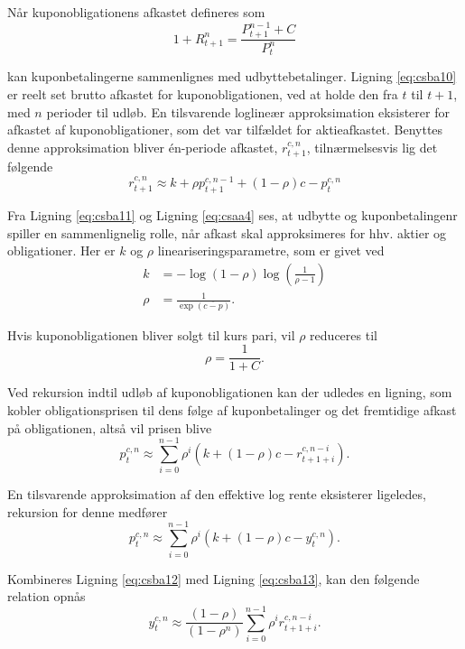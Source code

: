 \documentclass[
  a4paper,
  oneside]{memoir}
\begin{document}
Når kuponobligationens afkastet defineres som
\begin{equation}
1+R_{t+1}^n = \frac{P_{t+1}^{n-1}+C}{P_t^n} \label{eq:csba10}
\end{equation}

kan kuponbetalingerne sammenlignes med udbyttebetalinger. Ligning \eqref{eq:csba10} er reelt set brutto afkastet for kuponobligationen, ved at holde den fra \(t\) til \(t+1\), med \(n\) perioder til udløb. En tilsvarende loglineær approksimation eksisterer for afkastet af kuponobligationer, som det var tilfældet for aktieafkastet. Benyttes denne approksimation bliver én-periode afkastet, \(r_{t+1}^{c,n}\), tilnærmelsesvis lig det følgende
\begin{equation}
r_{t+1}^{c,n}\approx k + \rho p_{t+1}^{c,n-1} + (1-\rho)c - p_t^{c,n} \label{eq:csba11}
\end{equation}

Fra Ligning \eqref{eq:csba11} og Ligning \eqref{eq:csaa4} ses, at udbytte og kuponbetalingenr spiller en sammenlignelig rolle, når afkast skal approksimeres for hhv. aktier og obligationer. Her er \(k\) og \(\rho\) lineariseringsparametre, som er givet ved
\begin{align*}
k &= -\log(1-\rho)\log\left(\frac{1}{\rho-1}\right)\\
\rho&= \frac{1}{\exp\left(\overline{c-p}\right)}.
\end{align*}

Hvis kuponobligationen bliver solgt til kurs pari, vil \(\rho\) reduceres til
\[\rho=\frac{1}{1+C}.\]

Ved rekursion indtil udløb af kuponobligationen kan der udledes en ligning, som kobler obligationsprisen til dens følge af kuponbetalinger og det fremtidige afkast på obligationen, altså vil prisen blive
\begin{equation}
p_t^{c,n}\approx\sum_{i=0}^{n-1} \rho^i \left(k+(1-\rho)c - r_{t+1+i}^{c,n-i}\right). \label{eq:csba12}
\end{equation}

En tilsvarende approksimation af den effektive log rente eksisterer ligeledes, rekursion for denne medfører
\begin{equation}
p_t^{c,n}\approx\sum_{i=0}^{n-1} \rho^i \left(k+(1-\rho)c - y_{t}^{c,n}\right). \label{eq:csba13}
\end{equation}

Kombineres Ligning \eqref{eq:csba12} med Ligning \eqref{eq:csba13}, kan den følgende relation opnås
\begin{equation}
y_{t}^{c,n}\approx \frac{(1-\rho)}{(1-\rho^n)}\sum_{i=0}^{n-1} \rho^i r_{t+1+i}^{c,n-i}. \label{eq:csba14}
\end{equation}
\end{document}

